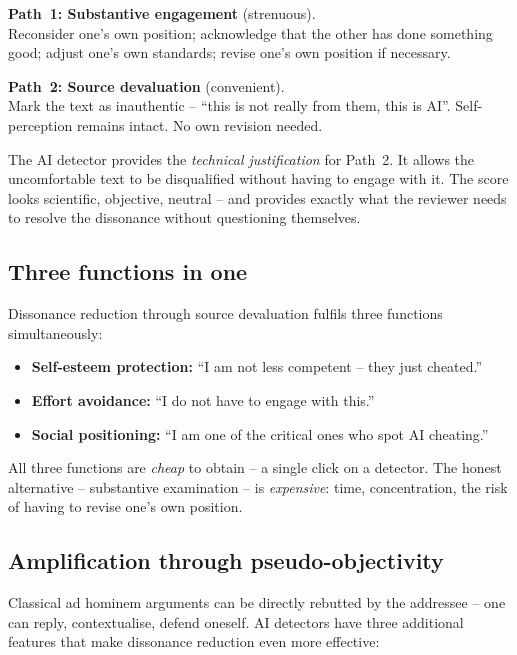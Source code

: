 \textbf{Path~1: Substantive engagement} (strenuous).\\
Reconsider one's own position; acknowledge that the other has done
something good; adjust one's own standards; revise one's own
position if necessary.

\textbf{Path~2: Source devaluation} (convenient).\\
Mark the text as inauthentic -- \enquote{this is not really from
them, this is AI}. Self-perception remains intact. No own revision
needed.

The AI detector provides the \emph{technical justification} for
Path~2. It allows the uncomfortable text to be disqualified without
having to engage with it. The score looks scientific, objective,
neutral -- and provides exactly what the reviewer needs to resolve
the dissonance without questioning themselves.

\subsection{Three functions in one}

Dissonance reduction through source devaluation fulfils three
functions simultaneously:

\begin{itemize}[leftmargin=2em,itemsep=2pt,topsep=2pt]
  \item \textbf{Self-esteem protection:} \enquote{I am not less
        competent -- they just cheated.}
  \item \textbf{Effort avoidance:} \enquote{I do not have to engage
        with this.}
  \item \textbf{Social positioning:} \enquote{I am one of the
        critical ones who spot AI cheating.}
\end{itemize}

All three functions are \emph{cheap} to obtain -- a single click on
a detector. The honest alternative -- substantive examination -- is
\emph{expensive}: time, concentration, the risk of having to revise
one's own position.

\subsection{Amplification through pseudo-objectivity}

Classical ad hominem arguments can be directly rebutted by the
addressee -- one can reply, contextualise, defend oneself. AI
detectors have three additional features that make dissonance
reduction even more effective:

